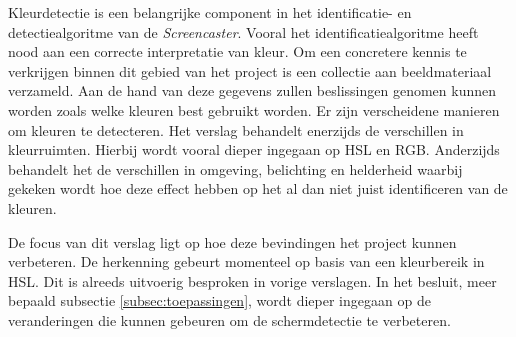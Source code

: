 
Kleurdetectie is een belangrijke component in het identificatie- en detectiealgoritme van de {\it Screencaster}. Vooral het identificatiealgoritme heeft nood aan een correcte interpretatie van kleur. Om een concretere kennis te verkrijgen binnen dit gebied van het project is een collectie aan beeldmateriaal verzameld. Aan de hand van deze gegevens zullen beslissingen genomen kunnen worden zoals welke kleuren best gebruikt worden. Er zijn verscheidene manieren om kleuren te detecteren. Het verslag behandelt enerzijds de verschillen in kleurruimten. Hierbij wordt vooral dieper ingegaan op HSL en RGB. Anderzijds behandelt het de verschillen in omgeving, belichting en helderheid waarbij gekeken wordt hoe deze effect hebben op het al dan niet juist identificeren van de kleuren.

De focus van dit verslag ligt op hoe deze bevindingen het project kunnen verbeteren. De herkenning gebeurt momenteel op basis van een kleurbereik in HSL. Dit is alreeds uitvoerig besproken in vorige verslagen. In het besluit, meer bepaald subsectie \ref{subsec:toepassingen}, wordt dieper ingegaan op de veranderingen die kunnen gebeuren om de schermdetectie te verbeteren.